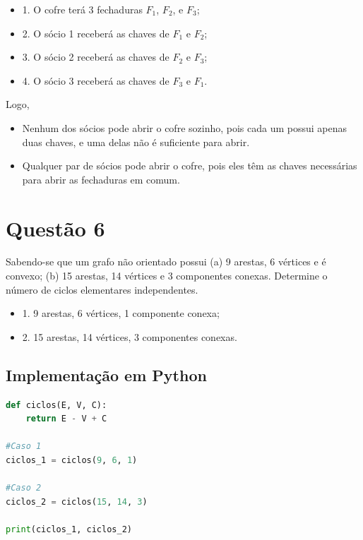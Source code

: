 \begin{itemize}
    \item 1. O cofre terá 3 fechaduras \( F_1 \), \( F_2 \), e \( F_3 \);
    \item 2. O sócio 1 receberá as chaves de \( F_1 \) e \( F_2 \);
    \item 3. O sócio 2 receberá as chaves de \( F_2 \) e \( F_3 \);
    \item 4. O sócio 3 receberá as chaves de \( F_3 \) e \( F_1 \).
\end{itemize}

Logo,

\begin{itemize}
    \item Nenhum dos sócios pode abrir o cofre sozinho, pois cada um possui apenas duas chaves, e uma delas não é suficiente para abrir.
    \sloppy
    \item Qualquer par de sócios pode abrir o cofre, pois eles têm as chaves necessárias para abrir as fechaduras em comum.
\end{itemize}


\section*{Questão 6}

Sabendo-se que um grafo não orientado possui (a) 9 arestas, 6 vértices e é convexo; (b) 15 arestas, 14 vértices e 3 componentes conexas. Determine o número de ciclos elementares independentes.

\begin{itemize}
    \item 1. 9 arestas, 6 vértices, 1 componente conexa;
    \item 2. 15 arestas, 14 vértices, 3 componentes conexas.
\end{itemize}

\subsection*{Implementação em Python}

\begin{lstlisting}[language=Python]
def ciclos(E, V, C):
    return E - V + C

#Caso 1
ciclos_1 = ciclos(9, 6, 1)

#Caso 2
ciclos_2 = ciclos(15, 14, 3)

print(ciclos_1, ciclos_2)
\end{lstlisting}

